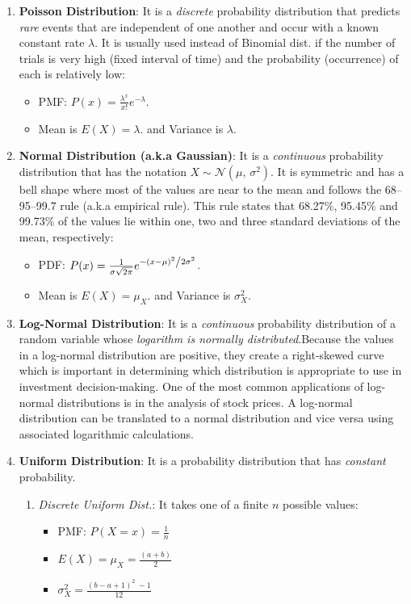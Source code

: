 \documentclass[11pt, twocolumn]{article}
\begin{document}
\begin{enumerate}
\item \textbf{Poisson Distribution}: It is a \textit{discrete} probability distribution that predicts \textit{rare} events that are independent of one another and occur with a known constant rate $\lambda$. It is usually used instead of Binomial dist. if the number of trials is very high (fixed interval of time) and the probability (occurrence) of each is relatively low:
	\begin{itemize}
	\item PMF: $P\left( x \right) = \frac{{\lambda ^x }}{{x!}} e^{ - \lambda } $.
	\item Mean is $E(X) = \lambda$. and Variance is $\lambda$.
	\end{itemize} 

\item \textbf{Normal Distribution (a.k.a Gaussian)}: It is a \textit{continuous} probability distribution that has the notation  $X \sim \mathcal{N}(\mu,\,\sigma^{2})$. It is symmetric and has a bell shape where most of the values are near to the mean and follows the 68–95–99.7 rule (a.k.a empirical rule). This rule states that 68.27\%, 95.45\% and 99.73\% of the values lie within one, two and three standard deviations of the mean, respectively:
	\begin{itemize}
	\item PDF: $P(x) = \frac{1}{{\sigma \sqrt {2\pi } }}e^{{{ - \left( {x - \mu } \right)^2 } \mathord{\left/ {\vphantom {{ - \left( {x - \mu } \right)^2 } {2\sigma ^2 }}} \right. \kern-\nulldelimiterspace} {2\sigma ^2 }}}$.
	\item Mean is $E(X) = \mu_X$. and Variance is $\sigma_X^2$.
	\end{itemize} 
	
\item \textbf{Log-Normal Distribution}: It is a \textit{continuous} probability distribution of a random variable whose \textit{logarithm is normally distributed}.Because the values in a log-normal distribution are positive, they create a right-skewed curve which is important in determining which distribution is appropriate to use in investment decision-making.  One of the most common applications of log-normal distributions is in the analysis of stock prices. A log-normal distribution can be translated to a normal distribution and vice versa using associated logarithmic calculations.
	
\item \textbf{Uniform Distribution}: It is a probability distribution that has \textit{constant} probability. 
	\begin{enumerate}
	\item \textit{Discrete Uniform Dist.}:  It takes one of a finite $n$ possible values:
		\begin{itemize}
		\item PMF: $P(X = x) = \frac{1}{n}$
		\item $E(X) = \mu_X = \frac{(a + b)}{2}$
		\item $\sigma_X^2 =\frac{(b - a + 1)^2 ~ - 1 }{12}$
		\end{itemize} 


\end{enumerate}
\end{enumerate}
\end{document}
